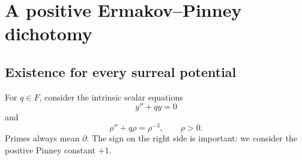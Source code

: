 \documentclass[11pt,a4paper]{article}
\numberwithin{equation}{section}
\theoremstyle{definition}
\theoremstyle{remark}
\begin{document}
\section{A positive Ermakov--Pinney dichotomy}\label{sec:pinney}

\subsection{Existence for every surreal potential}
For $q\in F$, consider the intrinsic scalar equations
\begin{equation}\label{eq:linearq}
 y''+qy=0
\end{equation}
and
\begin{equation}\label{eq:pinney}
 \rho''+q\rho=\rho^{-3},\qquad \rho>0.
\end{equation}
Primes always mean $\partial$. The sign on the right side is important:
we consider the positive Pinney constant $+1$.
\end{document}

